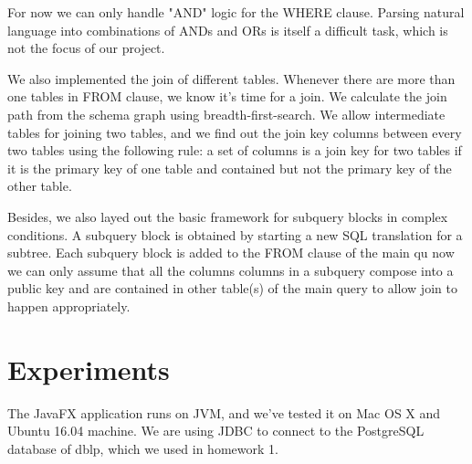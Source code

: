 \documentclass[twocolumn]{article}
\begin{document}
For now we can only handle "AND" logic for the WHERE clause. Parsing natural language into combinations of ANDs and ORs is itself a difficult task, which is not the focus of our project.

We also implemented the join of different tables. Whenever there are more than one tables in FROM clause, we know it's time for a join. We calculate the join path from the schema graph using breadth-first-search. We allow intermediate tables for joining two tables, and we find out the join key columns between every two tables using the following rule: a set of columns is a join key for two tables if it is the primary key of one table and contained but not the primary key of the other table.

Besides, we also layed out the basic framework for subquery blocks in complex conditions. A subquery block is obtained by starting a new SQL translation for a subtree. Each subquery block is added to the FROM clause of the main qu now we can only assume that all the columns columns in a subquery compose into a public key and are contained in other table(s) of the main query to allow join to happen appropriately.

\section{Experiments}
The JavaFX application runs on JVM, and we’ve tested it on Mac OS X and Ubuntu 16.04 machine. We are using JDBC to connect to the PostgreSQL database of dblp, which we used in homework 1.
\end{document}
